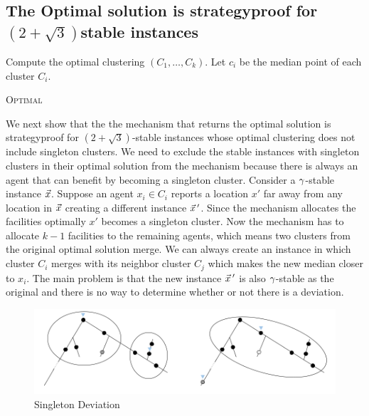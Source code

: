 \subsection{The Optimal solution is strategyproof for \texorpdfstring{$(2+\sqrt{3})$}-stable instances}



\begin{algorithm}[ht]
\label{algorithm:optimal}
\DontPrintSemicolon
\SetAlgoLined
\LinesNumbered
{}
Compute the optimal clustering
 $(C_1, \ldots, C_k)$. Let $c_i$ be the median point of each cluster $C_i$.\;


\caption{\textsc{Optimal}}
\end{algorithm}

We next show that the the mechanism that returns the optimal solution is strategyproof for $(2+\sqrt{3})$-stable instances whose optimal clustering does not include singleton clusters. We need to exclude the stable instances with singleton clusters in their optimal solution from the mechanism because there is always an agent that can benefit by becoming a singleton cluster. Consider a $\gamma$-stable instance $\vec{x}$. Suppose an agent $x_i \in C_i$ reports a location $x'$ far away from any location in $\vec{x}$ creating a different instance $\vec{x}\,'$. Since the mechanism allocates the facilities optimally $x'$ becomes a singleton cluster. Now the mechanism has to allocate $k-1$ facilities to the remaining agents, which means two clusters from the original optimal solution merge. We can always create an instance in which cluster $C_i$ merges with its neighbor cluster $C_j$ which makes the new median closer to $x_i$. The main problem is that the new instance $\vec{x}\,'$ is also $\gamma$-stable as the original and there is no way to determine whether or not there is a deviation. 


\begin{figure}[ht]
    \centering
    \includegraphics[width=\textwidth]{Images/singleton.png}
    \caption{Singleton Deviation}
    \label{fig:singleton}
\end{figure}

